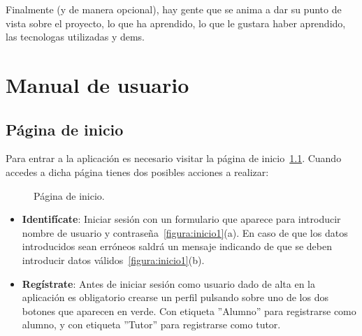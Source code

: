 \documentclass[a4paper, 12pt]{book}
\begin{document}
Finalmente (y de manera opcional), hay gente que se anima a dar su punto de
vista sobre el proyecto, lo que ha aprendido, lo que le gustara haber aprendido,
las tecnologas utilizadas y dems.




\cleardoublepage
\appendix
\chapter{Manual de usuario}
\label{app:manual}



\section{P\'agina de inicio}
Para entrar a la aplicaci\'on es necesario visitar la p\'agina de inicio~\ref{figura:inicio}. Cuando accedes a dicha p\'agina tienes dos posibles 
acciones a realizar:

\begin{figure}[htbp] 
  \centering
  \caption{P\'agina de inicio.}
  \label{figura:inicio}
\end{figure}

\begin{itemize}
  \item {\bfseries Identif\'icate}: Iniciar sesi\'on con un formulario que aparece para introducir nombre de usuario y contrase\~na~\ref{figura:inicio1}(a).
  En caso de que los datos introducidos sean err\'oneos saldr\'a un mensaje indicando de que se deben introducir datos v\'alidos~\ref{figura:inicio1}(b).
  \item {\bfseries Reg\'istrate}: Antes de iniciar sesi\'on como usuario dado de alta en la aplicaci\'on es obligatorio crearse un perfil pulsando sobre 
  uno de los dos botones que aparecen en verde. Con etiqueta ''Alumno'' para registrarse como alumno, y con etiqueta ''Tutor'' para registrarse como tutor.
\end{itemize} 
\end{document}
